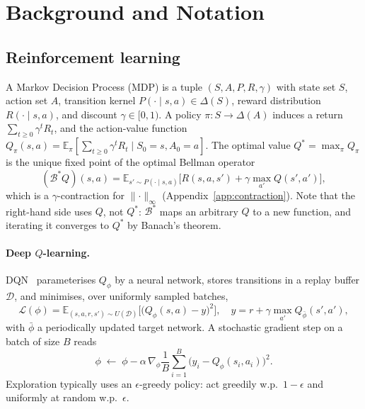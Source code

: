 \documentclass[sigconf]{aamas}
\newcommand{\Dcal}{\mathcal{D}}
\newcommand{\Bop}{\mathcal{B}}
\begin{document}
\section{Background and Notation}
\label{sec:background}

\subsection{Reinforcement learning}
A Markov Decision Process (MDP) is a tuple $(S,A,P,R,\gamma)$ with state set $S$,
action set $A$, transition kernel $P(\cdot\mid s,a)\in\Delta(S)$, reward
distribution $R(\cdot\mid s,a)$, and discount $\gamma\in[0,1)$. A policy
$\pi:S\to\Delta(A)$ induces a return $\sum_{t\ge0}\gamma^t R_{t}$, and the
action-value function $Q_\pi(s,a)=\mathbb{E}_\pi[\sum_{t\ge0}\gamma^tR_t\mid
S_0=s,A_0=a]$. The optimal value $Q^*=\max_\pi Q_\pi$ is the unique fixed point
of the optimal Bellman operator
\begin{equation}
\label{eq:bellman}
(\Bop^* Q)(s,a)=\mathbb{E}_{s'\sim P(\cdot\mid s,a)}\Big[R(s,a,s')+\gamma
\max_{a'}Q(s',a')\Big],
\end{equation}
which is a $\gamma$-contraction for $\lVert\cdot\rVert_\infty$
(Appendix~\ref{app:contraction}). Note that the right-hand side uses $Q$, not
$Q^*$: $\Bop^*$ maps an arbitrary $Q$ to a new function, and iterating it
converges to $Q^*$ by Banach's theorem.

\paragraph{Deep $Q$-learning.}
DQN~\cite{mnih2013playing} parameterises $Q_\phi$ by a neural network, stores
transitions in a replay buffer $\Dcal$, and minimises, over uniformly sampled
batches,
\begin{equation}
\label{eq:dqn}
\mathcal{L}(\phi)=\mathbb{E}_{(s,a,r,s')\sim U(\Dcal)}\Big[\big(Q_\phi(s,a)-y\big)^2\Big],
\quad y=r+\gamma\max_{a'}Q_{\bar\phi}(s',a'),
\end{equation}
with $\bar\phi$ a periodically updated target network. A stochastic gradient step
on a batch of size $B$ reads
\begin{equation}
\label{eq:sgd}
\phi\;\leftarrow\;\phi-\alpha\,\nabla_\phi\frac1B\sum_{i=1}^{B}\big(y_i-Q_\phi(s_i,a_i)\big)^2 .
\end{equation}
Exploration typically uses an $\epsilon$-greedy policy: act greedily w.p.\
$1-\epsilon$ and uniformly at random w.p.\ $\epsilon$.
\end{document}
